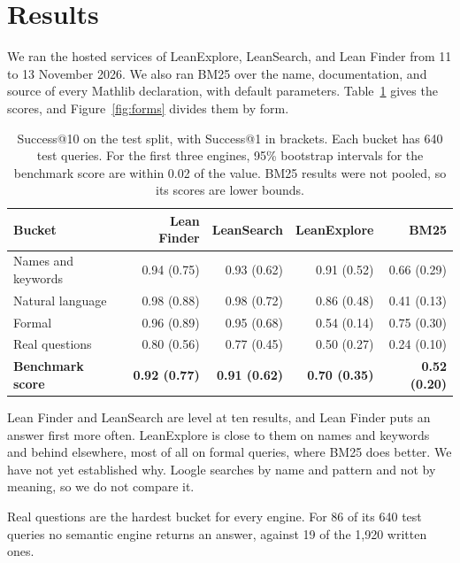 \documentclass{article}
\newcommand{\thead}[1]{\textbf{#1}}
\newcommand{\rowrule}{\arrayrulecolor{nBorderLight}\specialrule{0.4pt}{3pt}{3pt}\arrayrulecolor{nBorder}}
\begin{document}
\section{Results}
\label{sec:results}

We ran the hosted services of LeanExplore, LeanSearch, and Lean Finder
from 11 to 13 November 2026. We also ran BM25 over the name, documentation, and
source of every Mathlib declaration, with default parameters.
Table~\ref{tab:results} gives the scores, and Figure~\ref{fig:forms} divides
them by form.

\begin{table}[t]
\centering\small
\caption{Success@10 on the test split, with Success@1 in brackets. Each bucket
has 640 test queries. For the first three engines, 95\% bootstrap intervals for
the benchmark score are within 0.02 of the value. BM25 results were not pooled,
so its scores are lower bounds.}
\label{tab:results}
\begin{tabular}{@{}lrrrr@{}}
\toprule
\thead{Bucket} & \thead{Lean Finder} & \thead{LeanSearch} & \thead{LeanExplore} & \thead{BM25} \\
\midrule
Names and keywords & 0.94 (0.75) & 0.93 (0.62) & 0.91 (0.52) & 0.66 (0.29) \\
\rowrule
Natural language & 0.98 (0.88) & 0.98 (0.72) & 0.86 (0.48) & 0.41 (0.13) \\
\rowrule
Formal & 0.96 (0.89) & 0.95 (0.68) & 0.54 (0.14) & 0.75 (0.30) \\
\rowrule
Real questions & 0.80 (0.56) & 0.77 (0.45) & 0.50 (0.27) & 0.24 (0.10) \\
\midrule
\textbf{Benchmark score} & \textbf{0.92 (0.77)} & \textbf{0.91 (0.62)} & \textbf{0.70 (0.35)} & \textbf{0.52 (0.20)} \\
\bottomrule
\end{tabular}
\end{table}

Lean Finder and LeanSearch are level at ten results, and Lean Finder puts an
answer first more often. LeanExplore is close to them on names and keywords
and behind elsewhere, most of all on formal queries, where BM25 does better.
We have not yet established why. Loogle searches by name and pattern and
not by meaning, so we do not compare it.

Real questions are the hardest bucket for every engine. For 86 of its 640
test queries no semantic engine returns an answer, against 19 of the 1,920
written ones.
\end{document}
